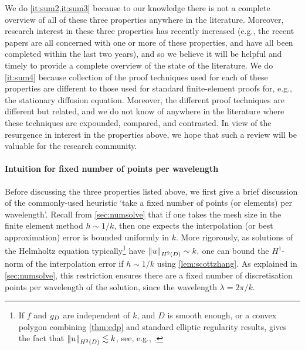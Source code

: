 We do \cref{it:sum2,it:sum3} because to our knowledge there is not a complete overview of all of these three properties anywhere in the literature. Moreover, research interest in these three properties has recently increased (e.g., the recent papers \cite{ChNi:18,LiWu:18,ChGaNiTo:18,ChNi:19} are all concerned with one or more of these properties, and have all been completed within the last two years), and so we believe it will be helpful and timely to provide a complete overview of the state of the literature. We do \cref{it:sum4} because collection of the proof techniques used for each of these properties are different to those used for standard finite-element proofs for, e.g., the stationary diffusion equation. Moreover, the different proof techniques are different but related, and we do not know of anywhere in the literature where these techniques are expounded, compared, and contrasted. In view of the resurgence in interest in the properties above, we hope that such a review will be valuable for the research community.

      

\paragraph{Intuition for fixed number of points per wavelength} Before discussing the three properties listed above, we first give a brief discussion of the commonly-used heuristic `take a fixed number of points (or elements) per wavelength'.  Recall from \cref{sec:numsolve} that if one takes the mesh size in the finite element method $h \sim 1/k$, then one expects the interpolation (or best approximation) error is bounded uniformly in $k$. More rigorously, as solutions of the Helmholtz equation typically\footnote{If $f$ and $g_{D}$ are independent of $k$, and $D$ is smooth enough, or a convex polygon  combining \cref{thm:edp} and standard elliptic regularity results, gives the fact that $\NHtD{u} \lesssim k$, see, e.g., \cite[Lemma 2.12]{GaGrSp:15}.} have $\NHtD{u} \sim k,$ one can bound the $H^1$-norm of the interpolation error if $h \sim 1/k$ using \cref{lem:scottzhang}.  As explained in \cref{sec:numsolve}, this restriction ensures there are a fixed number of discretisation points per wavelength of the solution, since the wavelength $\lambda = 2\pi/k.$

